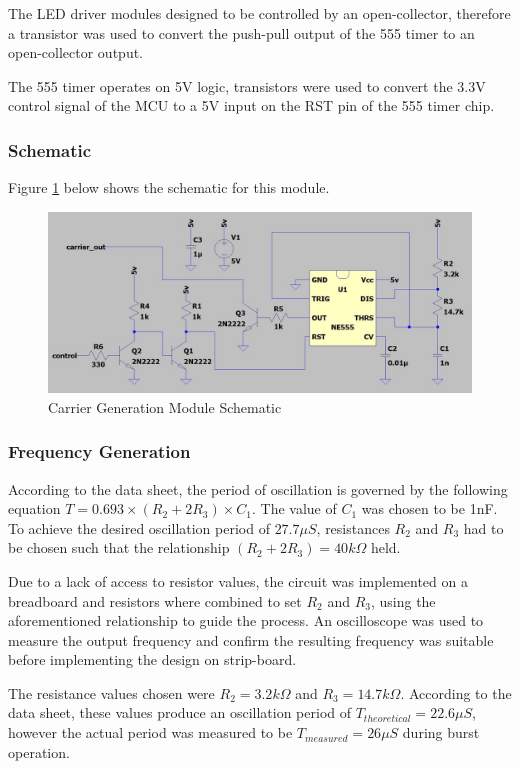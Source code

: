 The LED driver modules designed to be controlled by an open-collector, therefore a transistor was used to convert the push-pull output of the 555 timer to an open-collector output.

The 555 timer operates on 5V logic, transistors were used to convert the 3.3V control signal of the MCU to a 5V input on the RST pin of the 555 timer chip.

\subsubsection{Schematic}
Figure \ref{fig:schematic_carrier_generation} below shows the schematic for this module.

\begin{figure}[H]
	\centering
	\includegraphics[width=.8\textwidth]{figures/design/carrier_waveform_generator_555.JPG}
	\caption{Carrier Generation Module Schematic}
	\label{fig:schematic_carrier_generation}
\end{figure}

\subsubsection{Frequency Generation}

According to the data sheet, the period of oscillation is governed by the following equation \(T = 0.693\times (R_2 + 2R_3)\times C_1\). The value of $C_1$ was chosen to be 1nF. To achieve the desired oscillation period of $27.7\mu S$, resistances $R_2$ and $R_3$ had to be chosen such that the relationship $(R_2 + 2R_3) = 40k\Omega$ held.

Due to a lack of access to resistor values, the circuit was implemented on a breadboard and resistors where combined to set $R_2$ and $R_3$, using the aforementioned relationship to guide the process. An oscilloscope was used to measure the output frequency and confirm the resulting frequency was suitable before implementing the design on strip-board.

The resistance values chosen were $R_2 = 3.2k\Omega$ and $R_3 = 14.7k\Omega$. According to the data sheet, these values produce an oscillation period of \(T_{theoretical} = 22.6\mu S\), however the actual period was measured to be \(T_{measured} = 26\mu S\) during burst operation.

